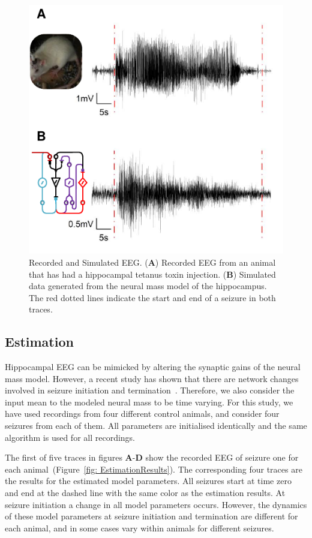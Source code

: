\begin{figure}[ht]
 	\centering
 		\includegraphics{fig/EEG.pdf}
 	\caption{Recorded and Simulated EEG. (\textbf{A}) Recorded EEG from an animal that has had a hippocampal tetanus toxin injection. (\textbf{B}) Simulated data generated from the neural mass model of the hippocampus. The red dotted lines indicate the start and end of a seizure in both traces.}
 	\label{fig: EEG}
 \end{figure}

\subsection{Estimation}

Hippocampal EEG can be mimicked by altering the synaptic gains of the neural mass model. However, a recent study has shown that there are network changes involved in seizure initiation and termination~\citep{truccolo2011single}. Therefore, we also consider the input mean to the modeled neural mass to be time varying. For this study, we have used recordings from four different control animals, and consider four seizures from each of them. All parameters are initialised identically and the same algorithm is used for all recordings. 

The first of five traces in figures \textbf{A}-\textbf{D} show the recorded EEG of seizure one for each animal~(Figure~\ref{fig: EstimationResults}). The corresponding four traces are the results for the estimated model parameters. All seizures start at time zero and end at the dashed line with the same color as the estimation results. At seizure initiation a change in all model parameters occurs. However, the dynamics of these model parameters at seizure initiation and termination are different for each animal, and in some cases vary within animals for different seizures. 

